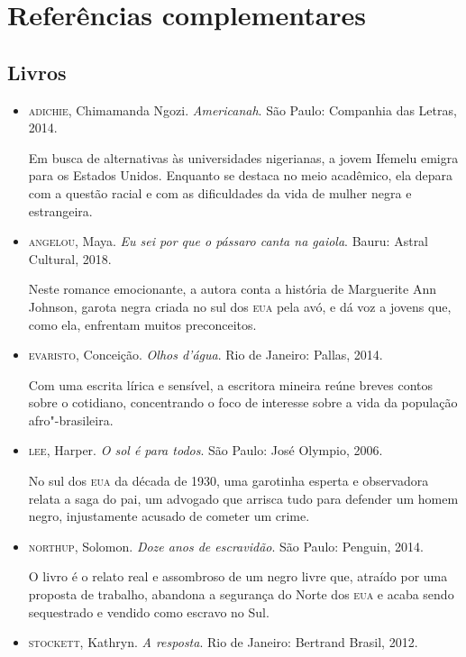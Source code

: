 \documentclass[12pt]{extarticle}
\begin{document}
\section{Referências complementares}

\subsection{Livros}
\begin{itemize}
\item\textsc{adichie}, Chimamanda Ngozi. \textit{Americanah}. São Paulo: Companhia
  das Letras, 2014.

Em busca de alternativas às universidades nigerianas, a jovem Ifemelu
emigra para os Estados Unidos. Enquanto se destaca no meio acadêmico,
ela depara com a questão racial e com as dificuldades da vida de mulher
negra e estrangeira.

\item\textsc{angelou}, Maya. \textit{Eu sei por que o pássaro canta na gaiola}.
  Bauru: Astral Cultural, 2018.

Neste romance emocionante, a autora conta a história de Marguerite Ann
Johnson, garota negra criada no sul dos \textsc{eua} pela avó, e dá voz a jovens
que, como ela, enfrentam muitos preconceitos.

\item\textsc{evaristo}, Conceição. \textit{Olhos d'água}. Rio de Janeiro: Pallas,
  2014.

Com uma escrita lírica e sensível, a escritora mineira reúne breves
contos sobre o cotidiano, concentrando o foco de interesse sobre a vida
da população afro"-brasileira.

\item\textsc{lee}, Harper. \textit{O sol é para todos}. São Paulo: José Olympio,
  2006.

No sul dos \textsc{eua} da década de 1930, uma garotinha esperta e observadora
relata a saga do pai, um advogado que arrisca tudo para defender um
homem negro, injustamente acusado de cometer um crime.

\item\textsc{northup}, Solomon. \textit{Doze anos de escravidão}. São Paulo:
  Penguin, 2014.

O livro é o relato real e assombroso de um negro livre que, atraído por
uma proposta de trabalho, abandona a segurança do Norte dos \textsc{eua} e acaba
sendo sequestrado e vendido como escravo no Sul.

\item\textsc{stockett}, Kathryn. \textit{A resposta}. Rio de Janeiro: Bertrand
  Brasil, 2012.


\end{itemize}
\end{document}
